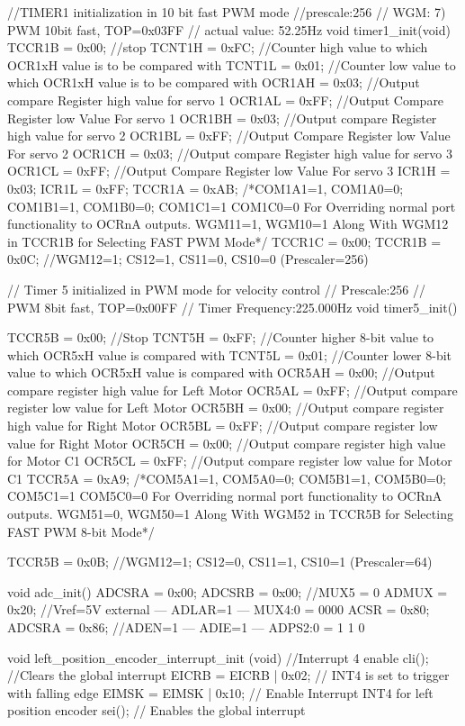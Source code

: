 //TIMER1 initialization in 10 bit fast PWM mode  
//prescale:256
// WGM: 7) PWM 10bit fast, TOP=0x03FF
// actual value: 52.25Hz 
void timer1_init(void)
{
 TCCR1B = 0x00; //stop
 TCNT1H = 0xFC; //Counter high value to which OCR1xH value is to be compared with
 TCNT1L = 0x01;	//Counter low value to which OCR1xH value is to be compared with
 OCR1AH = 0x03;	//Output compare Register high value for servo 1
 OCR1AL = 0xFF;	//Output Compare Register low Value For servo 1
 OCR1BH = 0x03;	//Output compare Register high value for servo 2
 OCR1BL = 0xFF;	//Output Compare Register low Value For servo 2
 OCR1CH = 0x03;	//Output compare Register high value for servo 3
 OCR1CL = 0xFF;	//Output Compare Register low Value For servo 3
 ICR1H  = 0x03;	
 ICR1L  = 0xFF;
 TCCR1A = 0xAB; /*{COM1A1=1, COM1A0=0; COM1B1=1, COM1B0=0; COM1C1=1 COM1C0=0}
 					For Overriding normal port functionality to OCRnA outputs.
				  {WGM11=1, WGM10=1} Along With WGM12 in TCCR1B for Selecting FAST PWM Mode*/
 TCCR1C = 0x00;
 TCCR1B = 0x0C; //WGM12=1; CS12=1, CS11=0, CS10=0 (Prescaler=256)
}

// Timer 5 initialized in PWM mode for velocity control
// Prescale:256
// PWM 8bit fast, TOP=0x00FF
// Timer Frequency:225.000Hz
void timer5_init()
{
	TCCR5B = 0x00;	//Stop
	TCNT5H = 0xFF;	//Counter higher 8-bit value to which OCR5xH value is compared with
	TCNT5L = 0x01;	//Counter lower 8-bit value to which OCR5xH value is compared with
	OCR5AH = 0x00;	//Output compare register high value for Left Motor
	OCR5AL = 0xFF;	//Output compare register low value for Left Motor
	OCR5BH = 0x00;	//Output compare register high value for Right Motor
	OCR5BL = 0xFF;	//Output compare register low value for Right Motor
	OCR5CH = 0x00;	//Output compare register high value for Motor C1
	OCR5CL = 0xFF;	//Output compare register low value for Motor C1
	TCCR5A = 0xA9;	/*{COM5A1=1, COM5A0=0; COM5B1=1, COM5B0=0; COM5C1=1 COM5C0=0}
 					  For Overriding normal port functionality to OCRnA outputs.
				  	  {WGM51=0, WGM50=1} Along With WGM52 in TCCR5B for Selecting FAST PWM 8-bit Mode*/
	
	TCCR5B = 0x0B;	//WGM12=1; CS12=0, CS11=1, CS10=1 (Prescaler=64)
}

void adc_init()
{
	ADCSRA = 0x00;
	ADCSRB = 0x00;		//MUX5 = 0
	ADMUX = 0x20;		//Vref=5V external --- ADLAR=1 --- MUX4:0 = 0000
	ACSR = 0x80;
	ADCSRA = 0x86;		//ADEN=1 --- ADIE=1 --- ADPS2:0 = 1 1 0
}


void left_position_encoder_interrupt_init (void) //Interrupt 4 enable
{
	cli(); //Clears the global interrupt
	EICRB = EICRB | 0x02; // INT4 is set to trigger with falling edge
	EIMSK = EIMSK | 0x10; // Enable Interrupt INT4 for left position encoder
	sei();   // Enables the global interrupt
}


